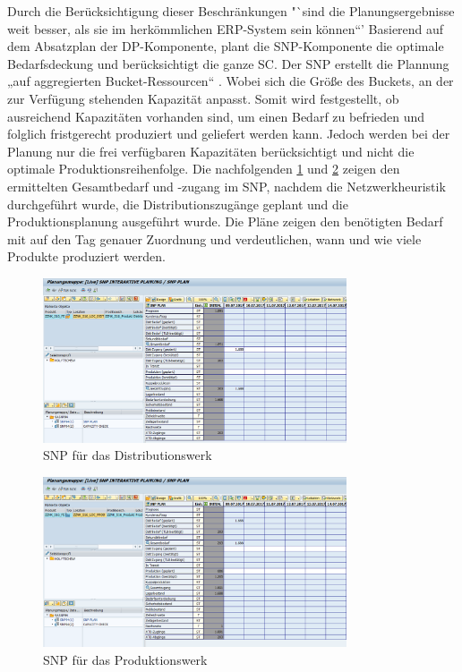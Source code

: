 Durch die Berücksichtigung dieser Beschränkungen "`sind die Planungsergebnisse weit besser, als sie im herkömmlichen \ac{ERP}-System sein können“' \cite[Abschnitt 4.3.4, Seite 1 f]{scm:script_17_1}
Basierend auf dem Absatzplan der \ac{DP}-Komponente, plant die \ac{SNP}-Komponente die optimale Bedarfsdeckung und berücksichtigt die ganze \ac{SC}. Der \ac{SNP} erstellt die Plannung „auf aggregierten Bucket-Ressourcen“ \cite[Abschnitt 4.3.4, Seite 1]{scm:script_17_1}. Wobei sich die Größe des Buckets, an der zur Verfügung stehenden Kapazität anpasst. Somit wird festgestellt, ob ausreichend Kapazitäten vorhanden sind, um einen Bedarf zu befrieden und folglich fristgerecht produziert und geliefert werden kann. Jedoch werden bei der Planung nur die frei verfügbaren Kapazitäten berücksichtigt und nicht die optimale Produktionsreihenfolge.
Die nachfolgenden \ref{fig:snp_dist} und \ref{fig:snp_prod} zeigen den ermittelten Gesamtbedarf und -zugang im \ac{SNP}, nachdem die Netzwerkheuristik \cite[Abschnitt 4.3.4, Seite 7 f]{scm:script_17_1} durchgeführt wurde, die Distributionszugänge geplant und die Produktionsplanung ausgeführt wurde.
Die Pläne zeigen den benötigten Bedarf mit auf den Tag genauer Zuordnung und verdeutlichen, wann und wie viele Produkte produziert werden.

\begin{figure}[h]
	\centering
	\includegraphics[width=0.8\textwidth]{../pics/SNP_dist_nko}
	\caption{SNP für das Distributionswerk}
	\label{fig:snp_dist}
\end{figure}

\begin{figure}[h]
	\centering
	\includegraphics[width=0.8\textwidth]{../pics/SNP_prod_nko}
	\caption{SNP für das Produktionswerk}
	\label{fig:snp_prod}
\end{figure}

